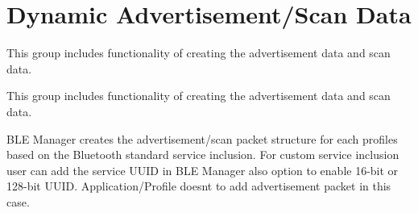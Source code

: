 \hypertarget{group__ble__manager__advertisement__structure}{}\section{Dynamic Advertisement/\+Scan Data}
\label{group__ble__manager__advertisement__structure}


This group includes functionality of creating the advertisement data and scan data.  


This group includes functionality of creating the advertisement data and scan data. 

B\+LE Manager creates the advertisement/scan packet structure for each profiles based on the Bluetooth standard service inclusion. For custom service inclusion user can add the service U\+U\+ID in B\+LE Manager also option to enable 16-\/bit or 128-\/bit U\+U\+ID. Application/\+Profile doesn\textquotesingle{}t to add advertisement packet in this case.